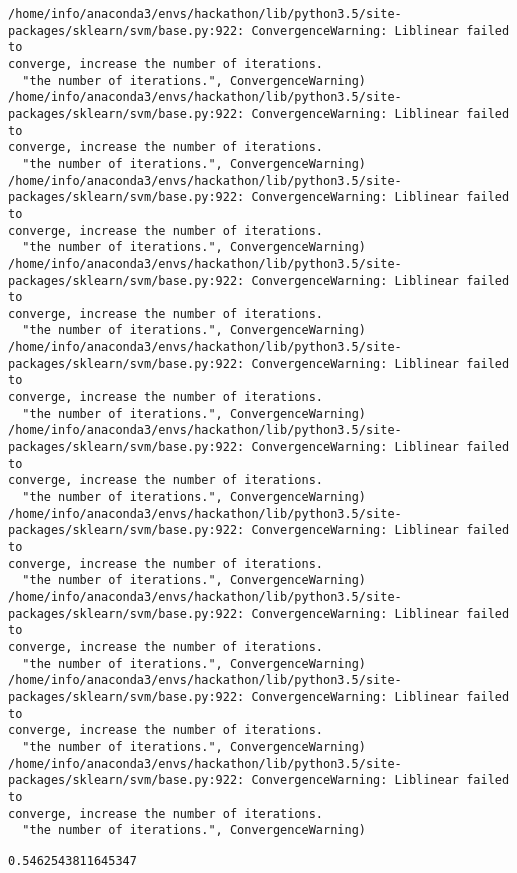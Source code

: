 \documentclass[11pt]{article}
\newcommand{\prompt}[4]{
        \llap{{\color{#2}[#3]: #4}}\vspace{-1.25em}
    }
\begin{document}
    \begin{Verbatim}[commandchars=\\\{\}]
/home/info/anaconda3/envs/hackathon/lib/python3.5/site-
packages/sklearn/svm/base.py:922: ConvergenceWarning: Liblinear failed to
converge, increase the number of iterations.
  "the number of iterations.", ConvergenceWarning)
/home/info/anaconda3/envs/hackathon/lib/python3.5/site-
packages/sklearn/svm/base.py:922: ConvergenceWarning: Liblinear failed to
converge, increase the number of iterations.
  "the number of iterations.", ConvergenceWarning)
/home/info/anaconda3/envs/hackathon/lib/python3.5/site-
packages/sklearn/svm/base.py:922: ConvergenceWarning: Liblinear failed to
converge, increase the number of iterations.
  "the number of iterations.", ConvergenceWarning)
/home/info/anaconda3/envs/hackathon/lib/python3.5/site-
packages/sklearn/svm/base.py:922: ConvergenceWarning: Liblinear failed to
converge, increase the number of iterations.
  "the number of iterations.", ConvergenceWarning)
/home/info/anaconda3/envs/hackathon/lib/python3.5/site-
packages/sklearn/svm/base.py:922: ConvergenceWarning: Liblinear failed to
converge, increase the number of iterations.
  "the number of iterations.", ConvergenceWarning)
/home/info/anaconda3/envs/hackathon/lib/python3.5/site-
packages/sklearn/svm/base.py:922: ConvergenceWarning: Liblinear failed to
converge, increase the number of iterations.
  "the number of iterations.", ConvergenceWarning)
/home/info/anaconda3/envs/hackathon/lib/python3.5/site-
packages/sklearn/svm/base.py:922: ConvergenceWarning: Liblinear failed to
converge, increase the number of iterations.
  "the number of iterations.", ConvergenceWarning)
/home/info/anaconda3/envs/hackathon/lib/python3.5/site-
packages/sklearn/svm/base.py:922: ConvergenceWarning: Liblinear failed to
converge, increase the number of iterations.
  "the number of iterations.", ConvergenceWarning)
/home/info/anaconda3/envs/hackathon/lib/python3.5/site-
packages/sklearn/svm/base.py:922: ConvergenceWarning: Liblinear failed to
converge, increase the number of iterations.
  "the number of iterations.", ConvergenceWarning)
/home/info/anaconda3/envs/hackathon/lib/python3.5/site-
packages/sklearn/svm/base.py:922: ConvergenceWarning: Liblinear failed to
converge, increase the number of iterations.
  "the number of iterations.", ConvergenceWarning)
\end{Verbatim}

            \begin{tcolorbox}[breakable, boxrule=.5pt, size=fbox, pad at break*=1mm, opacityfill=0]
\prompt{Out}{outcolor}{180}{\hspace{3.5pt}}
\begin{Verbatim}[commandchars=\\\{\}]
0.5462543811645347
\end{Verbatim}
\end{tcolorbox}
        

    
    
    
    
\end{document}
